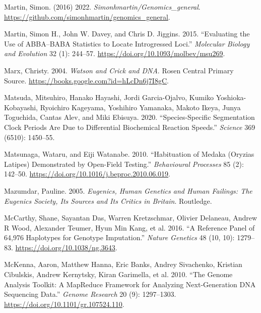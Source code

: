 \documentclass[
]{book}
\newlength{\cslhangindent}
\newlength{\cslentryspacingunit} %
\newenvironment{CSLReferences}[2] %
 {%
  \setlength{\parindent}{0pt}
  \ifodd #1
  \let\oldpar\par
  \def\par{\hangindent=\cslhangindent\oldpar}
  \fi
  \setlength{\parskip}{#2\cslentryspacingunit}
 }%
 {}
\begin{document}
\begin{CSLReferences}{1}{0}
\leavevmode{}%
Martin, Simon. (2016) 2022. \emph{Simonhmartin/Genomics\_general}. \url{https://github.com/simonhmartin/genomics_general}.

\leavevmode{}%
Martin, Simon H., John W. Davey, and Chris D. Jiggins. 2015. {``Evaluating the {Use} of {ABBA}--{BABA Statistics} to {Locate Introgressed Loci}.''} \emph{Molecular Biology and Evolution} 32 (1): 244--57. \url{https://doi.org/10.1093/molbev/msu269}.

\leavevmode{}%
Marx, Christy. 2004. \emph{Watson and {Crick} and {DNA}}. {Rosen Central Primary Source}. \url{https://books.google.com?id=hLcDn6j7I8gC}.

\leavevmode{}%
Matsuda, Mitsuhiro, Hanako Hayashi, Jordi Garcia-Ojalvo, Kumiko Yoshioka-Kobayashi, Ryoichiro Kageyama, Yoshihiro Yamanaka, Makoto Ikeya, Junya Toguchida, Cantas Alev, and Miki Ebisuya. 2020. {``Species-Specific Segmentation Clock Periods Are Due to Differential Biochemical Reaction Speeds.''} \emph{Science} 369 (6510): 1450--55.

\leavevmode{}%
Matsunaga, Wataru, and Eiji Watanabe. 2010. {``Habituation of Medaka ({Oryzias} Latipes) Demonstrated by Open-Field Testing.''} \emph{Behavioural Processes} 85 (2): 142--50. \url{https://doi.org/10.1016/j.beproc.2010.06.019}.

\leavevmode{}%
Mazumdar, Pauline. 2005. \emph{Eugenics, Human Genetics and Human Failings: The {Eugenics Society}, Its Sources and Its Critics in {Britain}}. {Routledge}.

\leavevmode{}%
McCarthy, Shane, Sayantan Das, Warren Kretzschmar, Olivier Delaneau, Andrew R Wood, Alexander Teumer, Hyun Min Kang, et al. 2016. {``A Reference Panel of 64,976 Haplotypes for Genotype Imputation.''} \emph{Nature Genetics} 48 (10, 10): 1279--83. \url{https://doi.org/10.1038/ng.3643}.

\leavevmode{}%
McKenna, Aaron, Matthew Hanna, Eric Banks, Andrey Sivachenko, Kristian Cibulskis, Andrew Kernytsky, Kiran Garimella, et al. 2010. {``The {Genome Analysis Toolkit}: {A MapReduce} Framework for Analyzing Next-Generation {DNA} Sequencing Data.''} \emph{Genome Research} 20 (9): 1297--1303. \url{https://doi.org/10.1101/gr.107524.110}.


\end{CSLReferences}
\end{document}
